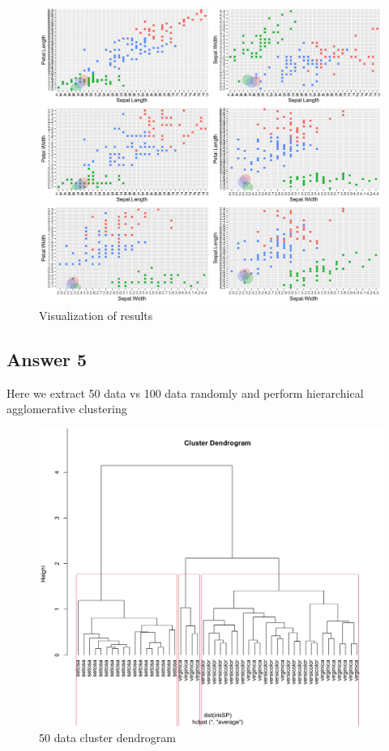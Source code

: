\documentclass{article}
\begin{document}
\begin{figure}[H]
    \caption{Visualization of results}
    \includegraphics[width=1\textwidth]{Fig5}
\end{figure}

\subsection{Answer 5}
Here we extract 50 data vs 100 data randomly and perform hierarchical agglomerative clustering

\begin{figure}[H]
    \caption{50 data cluster dendrogram}
    \includegraphics[width=1\textwidth]{Fig6}
\end{figure}
\end{document}
